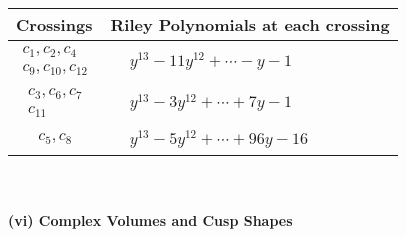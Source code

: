 \documentclass[1p]{elsarticle_modified}
\theoremstyle{definition}
\begin{document}
\begin{tabular}{m{50pt}|m{274pt}}
Crossings & \hspace{64pt}Riley Polynomials at each crossing \\
\hline $$\begin{aligned}c_{1},c_{2},c_{4}\\c_{9},c_{10},c_{12}\end{aligned}$$&$\begin{aligned}
&y^{13}-11 y^{12}+\cdots- y-1
\end{aligned}$\\
\hline $$\begin{aligned}c_{3},c_{6},c_{7}\\c_{11}\end{aligned}$$&$\begin{aligned}
&y^{13}-3 y^{12}+\cdots+7 y-1
\end{aligned}$\\
\hline $$\begin{aligned}c_{5},c_{8}\end{aligned}$$&$\begin{aligned}
&y^{13}-5 y^{12}+\cdots+96 y-16
\end{aligned}$\\
\hline
\end{tabular}\\~\\
\newpage\flushleft \textbf{(vi) Complex Volumes and Cusp Shapes}
\end{document}
